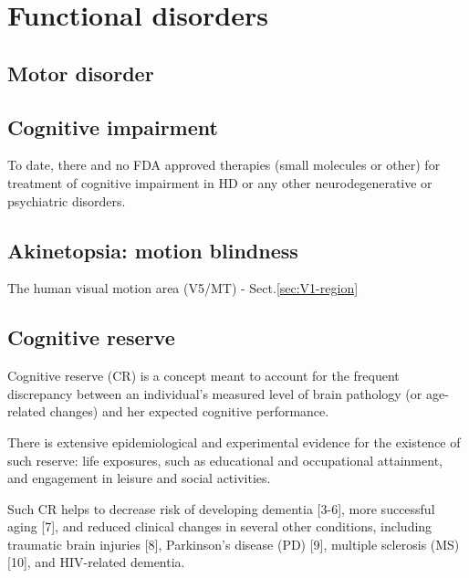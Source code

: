 \chapter{Functional disorders}

\section{Motor disorder}


\section{Cognitive impairment}

To date, there and no FDA approved therapies (small molecules or other) for
treatment of cognitive impairment in HD or any other neurodegenerative or
psychiatric disorders.

\section{Akinetopsia: motion blindness}
\label{sec:Akinetopsia-motion-blindness}

The human visual motion area (V5/MT) - Sect.\ref{sec:V1-region}
\section{Cognitive reserve}
\label{sec:cognitive-reserve}

Cognitive reserve (CR) is a concept meant to account for the frequent
discrepancy between an individual's measured level of brain pathology (or
age-related changes) and her expected cognitive performance.

There is extensive epidemiological and experimental evidence for the existence
of such reserve: life exposures, such as educational and occupational
attainment, and engagement in leisure and social activities.

Such CR helps to decrease risk of developing dementia [3-6], more successful
aging [7], and reduced clinical changes in several other conditions, including
traumatic brain injuries [8], Parkinson's disease (PD) [9], multiple sclerosis
(MS) [10], and HIV-related dementia.


